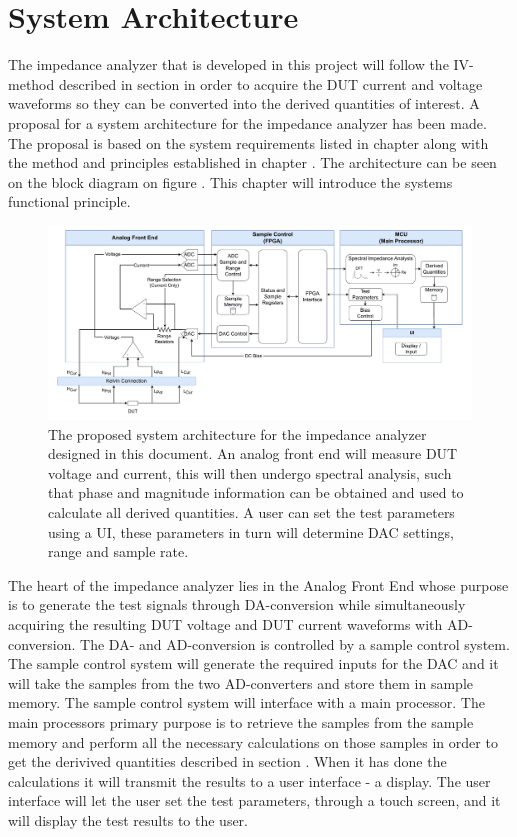 \chapter{System Architecture} \label{ch:SysArchitecture}

The impedance analyzer that is developed in this project will follow the IV-method described in section  in order to acquire the DUT current and voltage waveforms so they can be converted into the derived quantities of interest. A proposal for a system architecture for the impedance analyzer has been made. The proposal is based on the system requirements listed in chapter  along with the method and principles established in chapter . The architecture can be seen on the block diagram on figure . This chapter will introduce the systems functional principle.

\begin{figure}[H]
    \centering
    \includegraphics[clip, trim=18 0 18 0,width=1.0\textwidth]{Sections/6_SystemArchitecture/Figures/SystemArchitecture.pdf}
    \caption{The proposed system architecture for the impedance analyzer designed in this document. An analog front end will measure DUT voltage and current, 
    this will then undergo spectral analysis, such that phase and magnitude information can be obtained and used to calculate all derived quantities. A user can set the test parameters using a UI, these parameters in turn will determine DAC settings, range and sample rate.}
    \label{fig_6_SysArchitecture}
\end{figure}

The heart of the impedance analyzer lies in the Analog Front End whose purpose is to generate the test signals through DA-conversion while simultaneously acquiring the resulting DUT voltage and DUT current waveforms with AD-conversion. The DA- and AD-conversion is controlled by a sample control system. The sample control system will generate the required inputs for the DAC and it will take the samples from the two AD-converters and store them in sample memory. The sample control system will interface with a main processor. The main processors primary purpose is to retrieve the samples from the sample memory and perform all the necessary calculations on those samples in order to get the derivived quantities described in section . When it has done the calculations it will transmit the results to a user interface - a display. The user interface will let the user set the test parameters, through a touch screen, and it will display the test results to the user.

